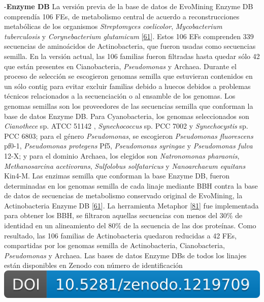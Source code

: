 \documentclass[12pt,twoside]{reedthesis}
\begin{document}
  -\textbf{Enzyme DB} La versión previa de la base de datos de EvoMining
  Enzyme DB comprendía 106 FEs, de metabolismo central de acuerdo a
  reconstrucciones metabólicas de los organismos \emph{Streptomyces
  coelicolor}, \emph{Mycobacterium tuberculosis} y \emph{Corynebacterium
  glutamicum}
  {[}\protect\hyperlink{ref-cruz-morales_phylogenomic_2016}{61}{]}. Estos
  106 EFs comprenden 339 secuencias de aminoácidos de Actinobacteria, que
  fueron usadas como secuencias semilla. En la versión actual, las 106
  familias fueron filtradas hasta quedar sólo 42 que están presentes en
  Cianobacteria, \emph{Pseudomonas} y Archaea. Durante el proceso de
  selección se escogieron genomas semilla que estuvieran contenidos en un
  sólo contig para evitar excluir familias debido a huecos debidos a
  problemas técnicos relacionados a la secuenciación o al ensamble de los
  genomas. Los genomas semillas son los proveedores de las secuencias
  semilla que conforman la base de datos Enzyme DB. Para Cyanobacteria,
  los genomas seleccionados son \emph{Cianothece} sp. ATCC 51142 ,
  \emph{Synechococcus} sp. PCC 7002 y \emph{Synechocystis} sp. PCC 6803;
  para el género \emph{Pseudomonas}, se escogieron \emph{Pseudomonas
  fluorescens} pf0-1, \emph{Pseudomonas protegens} Pf5, \emph{Pseudomonas
  syringae} y \emph{Pseudomonas fulva} 12-X; y para el dominio Archaea,
  los elegidos son \emph{Natronomonas pharaonis}, \emph{Methanosarcina
  acetivorans}, \emph{Sulfolobus solfataricus} y \emph{Nanoarchaeum
  equitans} Kin4-M. Las enzimas semilla que conforman la base Enzyme DB,
  fueron determinadas en los genomas semilla de cada linaje mediante BBH
  contra la base de datos de secuencias de metabolismo conservado original
  de EvoMining, la Actinobacteria Enzyme DB
  {[}\protect\hyperlink{ref-cruz-morales_phylogenomic_2016}{61}{]}. La
  herramienta Metaphor
  {[}\protect\hyperlink{ref-van_der_veen_metaphor_2014}{81}{]} fue
  implementada para obtener los BBH, se filtraron aquellas secuencias con
  menos del \(30\%\) de identidad en un alineamiento del \(80\%\) de la
  secuencia de las dos proteínas. Como resultado, las 106 familias de
  Actinobacteria quedaron reducidas a 42 FEs, compartidas por los genomas
  semilla de Actinobacteria, Cianobacteria, \emph{Pseudomonas} y Archaea.
  Las bases de datos Enzyme DBs de todos los linajes están disponibles en
  Zenodo con número de identificación
  \href{https://doi.org/10.5281/zenodo.1219709}{\includegraphics{chapter2/zenodo_1219709.png}}
  
\end{document}
